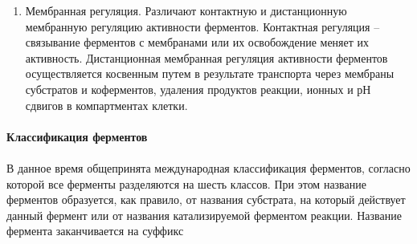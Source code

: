 \begin{enumerate}
	\item Мембранная регуляция. Различают контактную и дистанционную мембранную регуляцию активности ферментов. Контактная регуляция – связывание ферментов с мембранами или их освобождение меняет их активность. Дистанционная мембранная регуляция активности ферментов осуществляется косвенным путем в результате транспорта через мембраны субстратов и коферментов, удаления продуктов реакции, ионных и рН сдвигов в компартментах клетки.
\end{enumerate}



\paragraph{Классификация ферментов} 

\paragraph*{}В данное время общепринята международная классификация ферментов, согласно которой все ферменты разделяются на шесть классов. При этом название ферментов образуется, как правило, от названия субстрата, на который действует данный фермент или от названия катализируемой ферментом реакции. Название фермента заканчивается на суффикс \hfill

